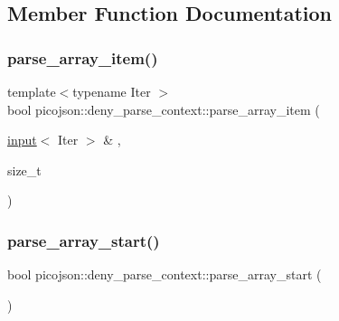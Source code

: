\subsection{Member Function Documentation}
\hypertarget{classpicojson_1_1deny__parse__context_ae15be8ad932ec02751870e962e9d34bf}{}\label{classpicojson_1_1deny__parse__context_ae15be8ad932ec02751870e962e9d34bf} 
\subsubsection{\texorpdfstring{parse\+\_\+array\+\_\+item()}{parse\_array\_item()}}
{\footnotesize\ttfamily template$<$typename Iter $>$ \\
bool picojson\+::deny\+\_\+parse\+\_\+context\+::parse\+\_\+array\+\_\+item (\begin{DoxyParamCaption}\item[{\hyperlink{classpicojson_1_1input}{input}$<$ Iter $>$ \&}]{,  }\item[{size\+\_\+t}]{ }\end{DoxyParamCaption})\hspace{0.3cm}{\ttfamily [inline]}}

\hypertarget{classpicojson_1_1deny__parse__context_afbe65c8c2b2ada93595587432189d20f}{}\label{classpicojson_1_1deny__parse__context_afbe65c8c2b2ada93595587432189d20f} 
\subsubsection{\texorpdfstring{parse\+\_\+array\+\_\+start()}{parse\_array\_start()}}
{\footnotesize\ttfamily bool picojson\+::deny\+\_\+parse\+\_\+context\+::parse\+\_\+array\+\_\+start (\begin{DoxyParamCaption}{ }\end{DoxyParamCaption})\hspace{0.3cm}{\ttfamily [inline]}}

\hypertarget{classpicojson_1_1deny__parse__context_ab284d5b0ee0e8df122d7e842a8d8e0b9}{}\label{classpicojson_1_1deny__parse__context_ab284d5b0ee0e8df122d7e842a8d8e0b9} 
